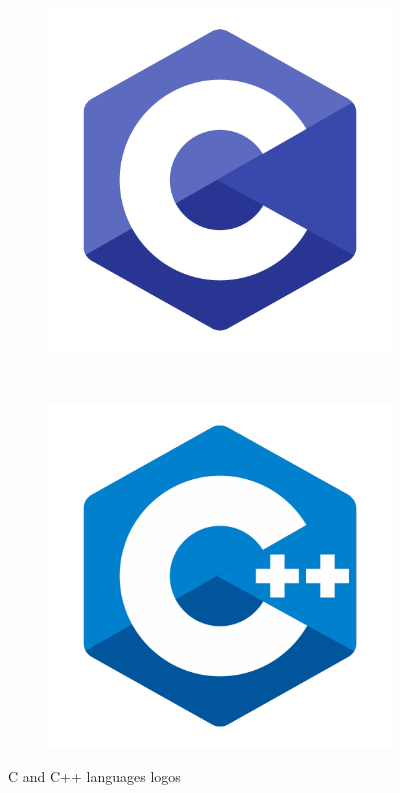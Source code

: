 \documentclass[a4paper,twoside,12pt]{book}
\begin{document}
\begin{figure}[H]
    \centering
    \begin{subfigure}[h]{0.3\textwidth}
        \includegraphics[width=\textwidth]{images/c_logo}
        \label{fig:c}
    \end{subfigure}
    ~
    \begin{subfigure}[h]{0.3\textwidth}
        \includegraphics[width=\textwidth]{images/cpp_logo}
        \label{fig:cpp}
    \end{subfigure}
    \caption{C and C++ languages logos}
    \label{fig:board}
\end{figure}
\end{document}
